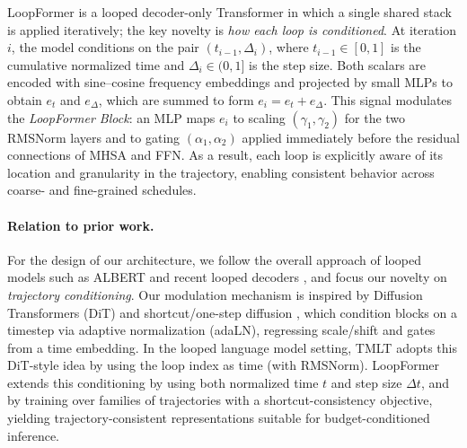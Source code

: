 LoopFormer is a looped decoder-only Transformer in which a single shared stack is applied iteratively; the key novelty is \emph{how each loop is conditioned}. At iteration $i$, the model conditions on the pair $(t_{i-1},\Delta_i)$, where $t_{i-1}\in[0,1]$ is the cumulative normalized time and $\Delta_i\in(0,1]$ is the step size. Both scalars are encoded with sine–cosine frequency embeddings and projected by small MLPs to obtain $e_t$ and $e_\Delta$, which are summed to form $e_i=e_t+e_\Delta$. This signal modulates the \emph{LoopFormer Block}: an MLP maps $e_i$ to scaling $(\gamma_1,\gamma_2)$ for the two RMSNorm layers and to gating $(\alpha_1,\alpha_2)$ applied immediately before the residual connections of MHSA and FFN. As a result, each loop is explicitly aware of its location and granularity in the trajectory, enabling consistent behavior across coarse- and fine-grained schedules.

\paragraph{Relation to prior work.}
For the design of our architecture, we follow the overall approach of looped models such as ALBERT and recent looped decoders \cite{lan2019albert, saunshi2025reasoning}, and focus our novelty on \emph{trajectory conditioning}. Our modulation mechanism is inspired by Diffusion Transformers (DiT) \cite{peebles2023scalable} and shortcut/one-step diffusion \cite{frans2024one}, which condition blocks on a timestep via adaptive normalization (adaLN), regressing scale/shift and gates from a time embedding. In the looped language model setting, TMLT \cite{xu2024expressive} adopts this DiT-style idea by using the loop index as time (with RMSNorm). LoopFormer extends this conditioning by using both normalized time $t$ and step size $\Delta t$, and by training over families of trajectories with a shortcut-consistency objective, yielding trajectory-consistent representations suitable for budget-conditioned inference.



